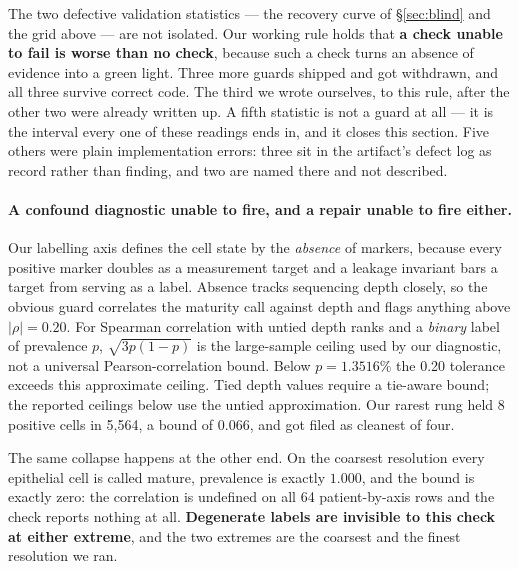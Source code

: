 
The two defective validation statistics --- the recovery curve of
\S\ref{sec:blind} and the grid above --- are not isolated. Our working rule holds that \textbf{a check unable to fail is worse
than no check}, because such a check turns an absence of evidence into a green
light. Three more guards shipped and got withdrawn, and all three survive
correct code. The third we wrote ourselves, to this rule, after the other two
were already written up. A fifth statistic is not a guard at all --- it is the
interval every one of these readings ends in, and it closes this section.
Five others were plain implementation errors: three sit in
the artifact's defect log as record rather than finding, and two are named
there and not described.

\paragraph{A confound diagnostic unable to fire, and a repair unable to fire
either.} Our labelling axis defines the cell state by the \emph{absence} of
markers, because every positive marker doubles as a measurement target and a
leakage invariant bars a target from serving as a label. Absence tracks
sequencing depth closely, so the obvious guard correlates the maturity call
against depth and flags anything above $|\rho| = 0.20$. For Spearman correlation with untied depth ranks and a \emph{binary} label
of prevalence $p$, $\sqrt{3p(1-p)}$ is the large-sample ceiling used by our
diagnostic, not a universal Pearson-correlation bound. Below $p = 1.3516\%$
the 0.20 tolerance exceeds this approximate ceiling. Tied depth values require
a tie-aware bound; the reported ceilings below use the untied approximation. Our rarest rung
held 8 positive cells in 5{,}564, a bound of 0.066, and got filed as cleanest of
four.

The same collapse happens at the other end. On the coarsest resolution every
epithelial cell is called mature, prevalence is exactly $1.000$, and the bound
is exactly zero: the correlation is undefined on all 64 patient-by-axis rows and
the check reports nothing at all. \textbf{Degenerate labels are invisible to
this check at either extreme}, and the two extremes are the coarsest and the
finest resolution we ran.

